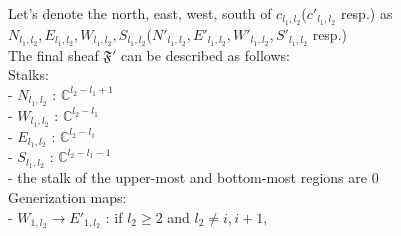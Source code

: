 Let's denote the north, east, west, south of $c_{l_1,l_2}$($c'_{l_1,l_2}$ resp.) as $N_{l_1,l_2}, E_{l_1,l_2}, W_{l_1,l_2},S_{l_1,l_2}$($N'_{l_1,l_2}, E'_{l_1,l_2}, W'_{l_1,l_2},S'_{l_1,l_2}$ resp.)\\

The final sheaf $\mathfrak{F}'$ can be described as follows:\\

Stalks:\\
- $N_{l_1,l_2}$ : $\mathbb{C}^{l_2 -l_1 +1}$\\
- $W_{l_1,l_2}$ : $\mathbb{C}^{l_2 -l_1}$\\
- $E_{l_1,l_2}$ : $\mathbb{C}^{l_2 -l_1}$\\
- $S_{l_1,l_2}$ : $\mathbb{C}^{l_2 -l_1 -1}$\\
- the stalk of the upper-most and bottom-most regions are $0$\\

Generization maps:\\
- $W_{1,l_2}\rightarrow E'_{1,l_2}$ : if $l_2\geq 2$ and $l_2 \neq i,i+1$,

